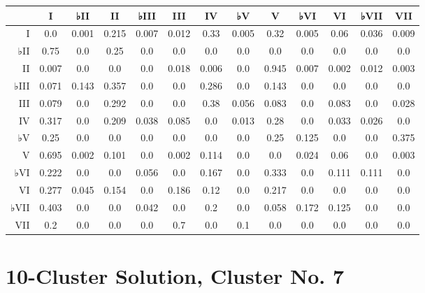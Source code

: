 \begin{table}[htbp]
\begin{minipage}{\linewidth}
\setlength{\tymax}{0.5\linewidth}
\centering
\small
\begin{tabulary}{\textwidth}{@{}RCCCCCCCCCCCC@{}} \toprule
&I&♭II&II&♭III&III&IV&♭V&V&♭VI&VI&♭VII&VII\\
\midrule
I&0.0&0.001&0.215&0.007&0.012&0.33&0.005&0.32&0.005&0.06&0.036&0.009\\
♭II&0.75&0.0&0.25&0.0&0.0&0.0&0.0&0.0&0.0&0.0&0.0&0.0\\
II&0.007&0.0&0.0&0.0&0.018&0.006&0.0&0.945&0.007&0.002&0.012&0.003\\
♭III&0.071&0.143&0.357&0.0&0.0&0.286&0.0&0.143&0.0&0.0&0.0&0.0\\
III&0.079&0.0&0.292&0.0&0.0&0.38&0.056&0.083&0.0&0.083&0.0&0.028\\
IV&0.317&0.0&0.209&0.038&0.085&0.0&0.013&0.28&0.0&0.033&0.026&0.0\\
♭V&0.25&0.0&0.0&0.0&0.0&0.0&0.0&0.25&0.125&0.0&0.0&0.375\\
V&0.695&0.002&0.101&0.0&0.002&0.114&0.0&0.0&0.024&0.06&0.0&0.003\\
♭VI&0.222&0.0&0.0&0.056&0.0&0.167&0.0&0.333&0.0&0.111&0.111&0.0\\
VI&0.277&0.045&0.154&0.0&0.186&0.12&0.0&0.217&0.0&0.0&0.0&0.0\\
♭VII&0.403&0.0&0.0&0.042&0.0&0.2&0.0&0.058&0.172&0.125&0.0&0.0\\
VII&0.2&0.0&0.0&0.0&0.7&0.0&0.1&0.0&0.0&0.0&0.0&0.0\\

\bottomrule

\end{tabulary}
\end{minipage}
\end{table}

\section{10-Cluster Solution, Cluster No. 7}
\label{10-clustersolutionclusterno.7}

